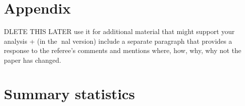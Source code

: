 \documentclass[11pt]{article}
\begin{document}
\newpage

\begin{subappendices}
\appendix

\section*{Appendix}\label{Appendix}
DLETE THIS LATER use it for additional material that might support your analysis + (in the nal
version) include a separate paragraph that provides a response to the referee's comments
and mentions where, how, why, why not the paper has changed.
\singlespacing
\section{Summary statistics}\label{ASec:xxxxx}
	
\end{subappendices}	



\newpage
{\footnotesize 
	
	\singlespacing
	
}


\end{document}
